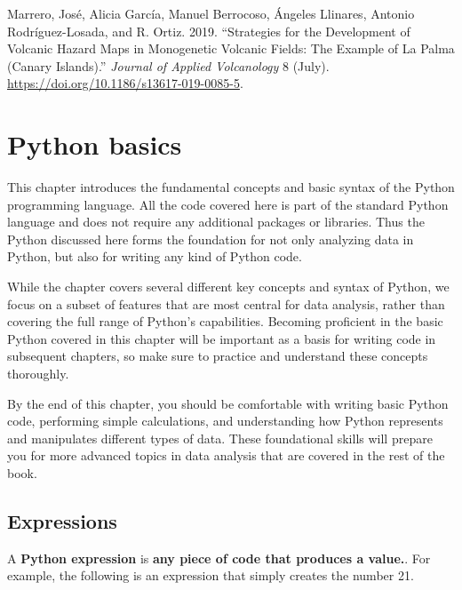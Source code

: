 \documentclass[
  letterpaper,
  DIV=11,
  numbers=noendperiod]{scrreprt}
\newlength{\cslhangindent}
\newenvironment{CSLReferences}[2] %
 {\begin{list}{}{%
  \setlength{\itemindent}{0pt}
  \setlength{\leftmargin}{0pt}
  \setlength{\parsep}{0pt}
  \ifodd #1
   \setlength{\leftmargin}{\cslhangindent}
   \setlength{\itemindent}{-1\cslhangindent}
  \fi
  \setlength{\itemsep}{#2\baselineskip}}}
 {\end{list}}
\begin{document}

\label{refs}
\begin{CSLReferences}{1}{0}
Marrero, José, Alicia García, Manuel Berrocoso, Ángeles Llinares,
Antonio Rodríguez-Losada, and R. Ortiz. 2019. {``Strategies for the
Development of Volcanic Hazard Maps in Monogenetic Volcanic Fields: The
Example of {La} {Palma} ({Canary} {Islands}).''} \emph{Journal of
Applied Volcanology} 8 (July).
\url{https://doi.org/10.1186/s13617-019-0085-5}.

\end{CSLReferences}


\chapter{Python basics}\label{python-basics}

This chapter introduces the fundamental concepts and basic syntax of the
Python programming language. All the code covered here is part of the
standard Python language and does not require any additional packages or
libraries. Thus the Python discussed here forms the foundation for not
only analyzing data in Python, but also for writing any kind of Python
code.

While the chapter covers several different key concepts and syntax of
Python, we focus on a subset of features that are most central for data
analysis, rather than covering the full range of Python's capabilities.
Becoming proficient in the basic Python covered in this chapter will be
important as a basis for writing code in subsequent chapters, so make
sure to practice and understand these concepts thoroughly.

By the end of this chapter, you should be comfortable with writing basic
Python code, performing simple calculations, and understanding how
Python represents and manipulates different types of data. These
foundational skills will prepare you for more advanced topics in data
analysis that are covered in the rest of the book.

\section{Expressions}\label{expressions}

A \textbf{Python expression} is \textbf{any piece of code that produces
a value.}. For example, the following is an expression that simply
creates the number 21.
\end{document}
